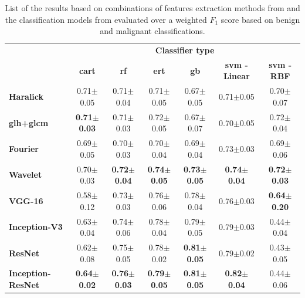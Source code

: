 \documentclass[journal,article,accept,moreauthors,pdftex, applsci]{Definitions/mdpi}
\newcommand{\fscore}{$F_{1}$ score}
\begin{document}
\begin{table}[h]
    \centering
    \begin{tabular}{lcccccc}
                                   &\multicolumn{6}{c}{\textbf{Classifier type}}                                                                                                         \\ \cline{2-7}
                                   &\textbf{\ac{cart}}     &\textbf{\ac{rf}}       &\textbf{\ac{ert}}      &\textbf{\ac{gb}}       &\textbf{\ac{svm} - Linear} &\textbf{\ac{svm} - RBF}  \\ \hline
    \textbf{Haralick}              &0.71$\pm$0.05          &0.71$\pm$0.04          &0.71$\pm$0.05          &0.67$\pm$0.05          &0.71$\pm$0.05              &0.70$\pm$0.07            \\ \cline{2-7}
    \textbf{\ac{glh}+\ac{glcm}}    &\textbf{0.71$\pm$0.03} &0.71$\pm$0.03          &0.72$\pm$0.05          &0.67$\pm$0.07          &0.70$\pm$0.05              &0.72$\pm$0.04            \\ \hline
    \textbf{Fourier}               &0.69$\pm$0.05          &0.70$\pm$0.03          &0.70$\pm$0.04          &0.69$\pm$0.04          &0.73$\pm$0.03              &0.69$\pm$0.06            \\ \cline{2-7}
    \textbf{Wavelet}               &0.70$\pm$0.03          &\textbf{0.72$\pm$0.04} &\textbf{0.74$\pm$0.05} &\textbf{0.73$\pm$0.05} &\textbf{0.74$\pm$0.04}     &\textbf{0.72$\pm$0.03}   \\ \hline\hline
    \textbf{VGG-16}                &0.58$\pm$0.12          &0.73$\pm$0.03          &0.76$\pm$0.06          &0.78$\pm$0.04          &0.76$\pm$0.03              &\textbf{0.64$\pm$0.20}   \\ \cline{2-7}
    \textbf{Inception-V3}          &0.63$\pm$0.04          &0.74$\pm$0.06          &0.78$\pm$0.04          &0.79$\pm$0.05          &0.79$\pm$0.03              &0.44$\pm$0.04            \\ \cline{2-7}
    \textbf{ResNet}                &0.62$\pm$0.08          &0.75$\pm$0.05          &0.78$\pm$0.02          &\textbf{0.81$\pm$0.05} &0.79$\pm$0.02              &0.43$\pm$0.05            \\ \cline{2-7}
    \textbf{Inception-ResNet}      &\textbf{0.64$\pm$0.02} &\textbf{0.76$\pm$0.03} &\textbf{0.79$\pm$0.05} &\textbf{0.81$\pm$0.05} &\textbf{0.82$\pm$0.04}     &0.44$\pm$0.06            \\ \hline
    \end{tabular}    
    \caption{List of the results based on combinations of features extraction methods from  and the classification models from  evaluated over a weighted \fscore{} based on benign and malignant classifications.}
    \label{tab:image_results}
\end{table}
\end{document}
